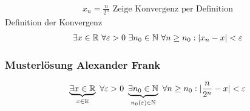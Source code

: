 \begin{align*}
    x_n = \frac{n}{2^n} \text{ Zeige Konvergenz per Definition}
\end{align*}
Definition der Konvergenz
\begin{align*}
    \exists x \in \R \ \forall \varepsilon > 0 \ \exists n_0 \in \N \ \forall n \geq n_0: |x_n - x| < \varepsilon
\end{align*}

\subsubsection{Musterlösung Alexander Frank}

\begin{align*}
    \underbrace{\exists x \in \mathbb R}_{x \in \mathbb R} \ \forall \varepsilon > 0 \ \underbrace{\exists n_0 \in \mathbb N}_{n_0(\varepsilon) \in \mathbb N} \ \forall n \geq n_0: |\frac{n}{2^n} - x| < \varepsilon
\end{align*}

